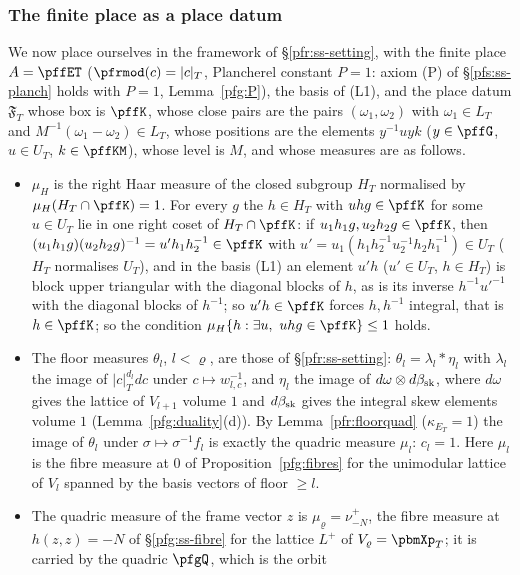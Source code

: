 \documentclass[10pt]{amsart}
\theoremstyle{definition}
\theoremstyle{remark}
\begin{document}
\subsubsection*{The finite place as a place datum}
We now place ourselves in the framework of \S\ref{pfr:ss-setting}, with the finite place
$A=\pffET$ ($\pfrmod(c)=|c|_T$, Plancherel constant $P=1$: axiom (P) of \S\ref{pfs:ss-planch} holds with $P=1$, Lemma~\ref{pfg:P}), the basis of (L1), and the place datum
$\mathfrak F_T$ whose box is $\pffK$, whose close pairs are the pairs $(\omega_1,\omega_2)$ with $\omega_1\in
L_T$ and $M^{-1}(\omega_1-\omega_2)\in L_T$, whose positions are the elements $y^{-1}uyk$
($y\in\pffG$, $u\in U_T$, $k\in\pffKM$), whose level is $M$, and whose measures are as follows.
\begin{itemize}
\item $\mu_H$ is the right Haar measure of the closed subgroup $H_T$ normalised by $\mu_H(H_T\cap\pffK)=1$. For every $g$
the $h\in H_T$ with $uhg\in\pffK$ for some $u\in U_T$ lie in one right coset of $H_T\cap\pffK$: if $u_1h_1g,u_2h_2g\in\pffK$, then
$(u_1h_1g)(u_2h_2g)^{-1}=u'h_1h_2^{-1}\in\pffK$ with $u'=u_1(h_1h_2^{-1}u_2^{-1}h_2h_1^{-1})\in U_T$ ($H_T$ normalises $U_T$), and in the
basis (L1) an element $u'h$ ($u'\in U_T$, $h\in H_T$) is block upper triangular with the diagonal blocks of $h$, as is its
inverse $h^{-1}u'^{-1}$ with the diagonal blocks of $h^{-1}$; so $u'h\in\pffK$ forces $h,h^{-1}$ integral, that is $h\in\pffK$; so the condition $\mu_H\{h:\exists u,\ uhg\in\pffK\}\le1$ holds.
\item The floor measures $\theta_l$, $l<\varrho$, are those of \S\ref{pfr:ss-setting}: $\theta_l=\lambda_l*\eta_l$ with
$\lambda_l$ the image of $|c|_T^{d_l}dc$ under $c\mapsto w_{l,c}^{-1}$, and $\eta_l$ the image of $d\omega\otimes d\beta_{\rm sk}$,
where $d\omega$ gives the lattice of $V_{l+1}$ volume $1$ and $d\beta_{\rm sk}$ gives the integral skew elements volume $1$
(Lemma~\ref{pfg:duality}(d)). By Lemma~\ref{pfr:floorquad} ($\kappa_{E_T}=1$) the image of $\theta_l$ under
$\sigma\mapsto\sigma^{-1}f_l$ is exactly the quadric measure $\mu_l$: $c_l=1$. Here $\mu_l$ is the fibre measure at $0$ of
Proposition~\ref{pfg:fibres} for the unimodular lattice of $V_l$ spanned by the basis vectors of floor $\ge l$.
\item The quadric measure of the frame vector $z$ is $\mu_\varrho=\nu^+_{-N}$, the fibre measure at $h(z,z)=-N$ of
\S\ref{pfg:ss-fibre} for the lattice $L^+$ of $V_\varrho=\pbmXp_T$; it is carried by the quadric $\pfgQ$, which is the orbit

\end{itemize}
\end{document}
